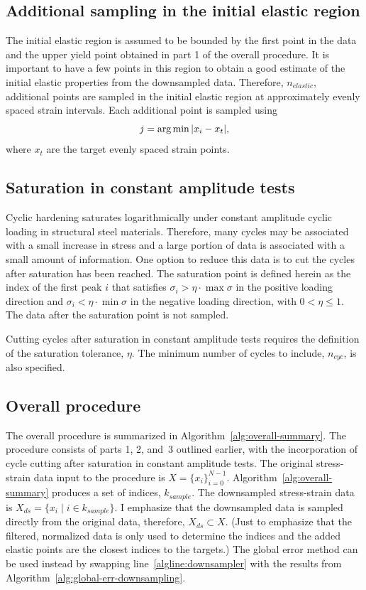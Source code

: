 \documentclass[a4paper,11pt]{article}
\begin{document}
\subsection{Additional sampling in the initial elastic region}

The initial elastic region is assumed to be bounded by the first point in the data and the upper yield point obtained in part 1 of the overall procedure.
It is important to have a few points in this region to obtain a good estimate of the initial elastic properties from the downsampled data.
Therefore, $n_{elastic}$, additional points are sampled in the initial elastic region at approximately evenly spaced strain intervals.
Each additional point is sampled using
\begin{equation}
    j = \arg \min \abs{x_i - x_{t}},
\end{equation}
where $x_t$ are the target evenly spaced strain points.

\subsection{Saturation in constant amplitude tests}

Cyclic hardening saturates logarithmically under constant amplitude cyclic loading in structural steel materials.
Therefore, many cycles may be associated with a small increase in stress and a large portion of data is associated with a small amount of information.
One option to reduce this data is to cut the cycles after saturation has been reached.
The saturation point is defined herein as the index of the first peak $i$ that satisfies $\sigma_i > \eta \cdot \max \sigma$ in the positive loading direction and $\sigma_i < \eta \cdot \min \sigma$ in the negative loading direction, with $0 < \eta \leq 1$.
The data after the saturation point is not sampled.

Cutting cycles after saturation in constant amplitude tests requires the definition of the saturation tolerance, $\eta$.
The minimum number of cycles to include, $n_{cyc}$, is also specified.


\subsection{Overall procedure}

The overall procedure is summarized in Algorithm~\ref{alg:overall-summary}.
The procedure consists of parts 1, 2, and~3 outlined earlier, with the incorporation of cycle cutting after saturation in constant amplitude tests.
The original stress-strain data input to the procedure is $X = \{x_i \}_{i=0}^{N-1}$.
Algorithm~\ref{alg:overall-summary} produces a set of indices, $k_{sample}$.
The downsampled stress-strain data is $X_{ds} = \{ x_i \mid i \in k_{sample} \}$.
I emphasize that the downsampled data is sampled directly from the original data, therefore, $X_{ds} \subset X$.
(Just to emphasize that the filtered, normalized data is only used to determine the indices and the added elastic points are the closest indices to the targets.)
The global error method can be used instead by swapping line~\ref{algline:downsampler} with the results from Algorithm~\ref{alg:global-err-downsampling}.
\end{document}
